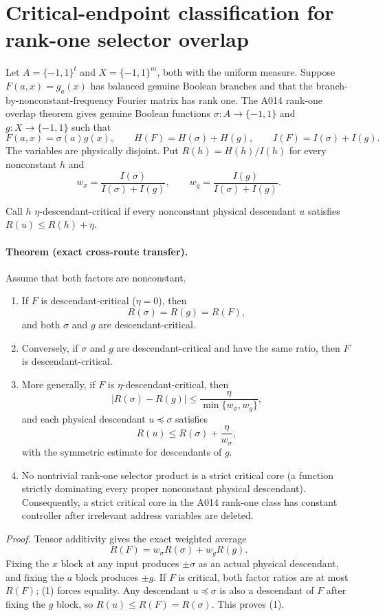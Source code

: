 \section*{Critical-endpoint classification for rank-one selector overlap}

Let $A=\{-1,1\}^t$ and $X=\{-1,1\}^m$, both with the uniform
measure.  Suppose $F(a,x)=g_a(x)$ has balanced genuine Boolean branches and
that the branch-by-nonconstant-frequency Fourier matrix has rank one.  The
A014 rank-one overlap theorem gives genuine Boolean functions
$\sigma:A\to\{-1,1\}$ and $g:X\to\{-1,1\}$ such that
\[
        F(a,x)=\sigma(a)g(x),
        \qquad H(F)=H(\sigma)+H(g),
        \qquad I(F)=I(\sigma)+I(g).
\]
The variables are physically disjoint.  Put $R(h)=H(h)/I(h)$ for every
nonconstant $h$ and
\[
 w_\sigma=\frac{I(\sigma)}{I(\sigma)+I(g)},\qquad
 w_g=\frac{I(g)}{I(\sigma)+I(g)}.
\]

Call $h$ $\eta$-descendant-critical if every nonconstant physical
descendant $u$ satisfies $R(u)\le R(h)+\eta$.

\paragraph{Theorem (exact cross-route transfer).}
Assume that both factors are nonconstant.
\begin{enumerate}
\item If $F$ is descendant-critical ($\eta=0$), then
\[
 R(\sigma)=R(g)=R(F),
\]
and both $\sigma$ and $g$ are descendant-critical.
\item Conversely, if $\sigma$ and $g$ are descendant-critical and have the
same ratio, then $F$ is descendant-critical.
\item More generally, if $F$ is $\eta$-descendant-critical, then
\[
 |R(\sigma)-R(g)|\le
 \frac{\eta}{\min\{w_\sigma,w_g\}},
\]
and each physical descendant $u\preceq\sigma$ satisfies
\[
 R(u)\le R(\sigma)+\frac{\eta}{w_\sigma},
\]
with the symmetric estimate for descendants of $g$.
\item No nontrivial rank-one selector product is a strict critical core (a
function strictly dominating every proper nonconstant physical descendant).
Consequently, a strict critical core in the A014 rank-one class has constant
controller after irrelevant address variables are deleted.
\end{enumerate}

\emph{Proof.}
Tensor additivity gives the exact weighted average
\[
 R(F)=w_\sigma R(\sigma)+w_g R(g).                 \tag{1}
\]
Fixing the $x$ block at any input produces $\pm\sigma$ as an actual
physical descendant, and fixing the $a$ block produces $\pm g$.  If $F$ is
critical, both factor ratios are at most $R(F)$; (1) forces equality.
Any descendant $u\preceq\sigma$ is also a descendant of $F$ after fixing
the $g$ block, so $R(u)\le R(F)=R(\sigma)$.  This proves (1).

